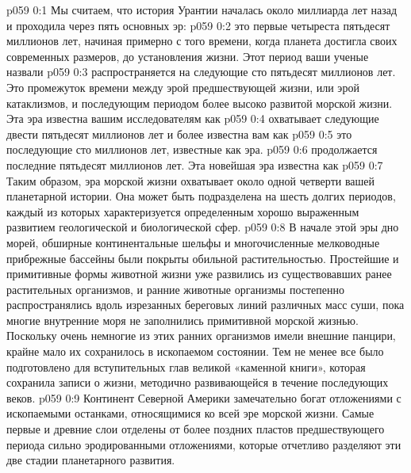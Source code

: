 \author{Носитель Жизни}
\vs p059 0:1 Мы считаем, что история Урантии началась около миллиарда лет назад и проходила через пять основных эр:
\vs p059 0:2 \bibnobreakspace {} это первые четыреста пятьдесят миллионов лет, начиная примерно с того времени, когда планета достигла своих современных размеров, до установления жизни. Этот период ваши ученые назвали 
\vs p059 0:3 \bibnobreakspace {} распространяется на следующие сто пятьдесят миллионов лет. Это промежуток времени между эрой предшествующей жизни, или эрой катаклизмов, и последующим периодом более высоко развитой морской жизни. Эта эра известна вашим исследователям как 
\vs p059 0:4 \bibnobreakspace {} охватывает следующие двести пятьдесят миллионов лет и более известна вам как 
\vs p059 0:5 \bibnobreakspace {} это последующие сто миллионов лет, известные как  эра.
\vs p059 0:6 \bibnobreakspace {} продолжается последние пятьдесят миллионов лет. Эта новейшая эра известна как 
\vs p059 0:7 \pc Таким образом, эра морской жизни охватывает около одной четверти вашей планетарной истории. Она может быть подразделена на шесть долгих периодов, каждый из которых характеризуется определенным хорошо выраженным развитием геологической и биологической сфер.
\vs p059 0:8 В начале этой эры дно морей, обширные континентальные шельфы и многочисленные мелководные прибрежные бассейны были покрыты обильной растительностью. Простейшие и примитивные формы животной жизни уже развились из существовавших ранее растительных организмов, и ранние животные организмы постепенно распространялись вдоль изрезанных береговых линий различных масс суши, пока многие внутренние моря не заполнились примитивной морской жизнью. Поскольку очень немногие из этих ранних организмов имели внешние панцири, крайне мало их сохранилось в ископаемом состоянии. Тем не менее все было подготовлено для вступительных глав великой «каменной книги», которая сохранила записи о жизни, методично развивающейся в течение последующих веков.
\vs p059 0:9 Континент Северной Америки замечательно богат отложениями с ископаемыми останками, относящимися ко всей эре морской жизни. Самые первые и древние слои отделены от более поздних пластов предшествующего периода сильно эродированными отложениями, которые отчетливо разделяют эти две стадии планетарного развития.
